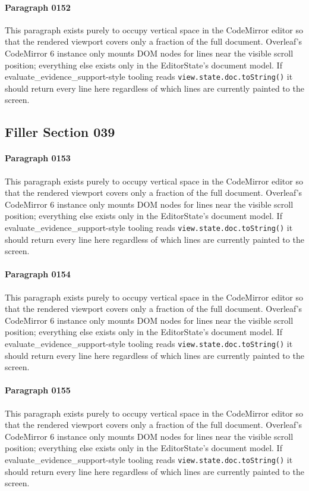 \documentclass{article}
\begin{document}
\paragraph{Paragraph 0152}
This paragraph exists purely to occupy vertical space in the CodeMirror editor so that the rendered viewport covers only a fraction of the full document. Overleaf's CodeMirror 6 instance only mounts DOM nodes for lines near the visible scroll position; everything else exists only in the EditorState's document model. If evaluate\_evidence\_support-style tooling reads \texttt{view.state.doc.toString()} it should return every line here regardless of which lines are currently painted to the screen.

\subsection{Filler Section 039}
\paragraph{Paragraph 0153}
This paragraph exists purely to occupy vertical space in the CodeMirror editor so that the rendered viewport covers only a fraction of the full document. Overleaf's CodeMirror 6 instance only mounts DOM nodes for lines near the visible scroll position; everything else exists only in the EditorState's document model. If evaluate\_evidence\_support-style tooling reads \texttt{view.state.doc.toString()} it should return every line here regardless of which lines are currently painted to the screen.

\paragraph{Paragraph 0154}
This paragraph exists purely to occupy vertical space in the CodeMirror editor so that the rendered viewport covers only a fraction of the full document. Overleaf's CodeMirror 6 instance only mounts DOM nodes for lines near the visible scroll position; everything else exists only in the EditorState's document model. If evaluate\_evidence\_support-style tooling reads \texttt{view.state.doc.toString()} it should return every line here regardless of which lines are currently painted to the screen.

\paragraph{Paragraph 0155}
This paragraph exists purely to occupy vertical space in the CodeMirror editor so that the rendered viewport covers only a fraction of the full document. Overleaf's CodeMirror 6 instance only mounts DOM nodes for lines near the visible scroll position; everything else exists only in the EditorState's document model. If evaluate\_evidence\_support-style tooling reads \texttt{view.state.doc.toString()} it should return every line here regardless of which lines are currently painted to the screen.
\end{document}
